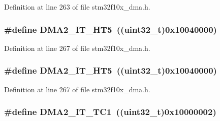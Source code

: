 Definition at line 263 of file stm32f10x\+\_\+dma.\+h.

\subsubsection[{\texorpdfstring{D\+M\+A2\+\_\+\+I\+T\+\_\+\+H\+T5}{DMA2_IT_HT5}}]{\setlength{\rightskip}{0pt plus 5cm}\#define D\+M\+A2\+\_\+\+I\+T\+\_\+\+H\+T5~(({\bf uint32\+\_\+t})0x10040000)}\hypertarget{group___d_m_a__interrupts__definition_ga4c1e0d1572267c1d48d787009148e3ef}{}\label{group___d_m_a__interrupts__definition_ga4c1e0d1572267c1d48d787009148e3ef}


Definition at line 267 of file stm32f10x\+\_\+dma.\+h.

\subsubsection[{\texorpdfstring{D\+M\+A2\+\_\+\+I\+T\+\_\+\+H\+T5}{DMA2_IT_HT5}}]{\setlength{\rightskip}{0pt plus 5cm}\#define D\+M\+A2\+\_\+\+I\+T\+\_\+\+H\+T5~(({\bf uint32\+\_\+t})0x10040000)}\hypertarget{group___d_m_a__interrupts__definition_ga4c1e0d1572267c1d48d787009148e3ef}{}\label{group___d_m_a__interrupts__definition_ga4c1e0d1572267c1d48d787009148e3ef}


Definition at line 267 of file stm32f10x\+\_\+dma.\+h.

\subsubsection[{\texorpdfstring{D\+M\+A2\+\_\+\+I\+T\+\_\+\+T\+C1}{DMA2_IT_TC1}}]{\setlength{\rightskip}{0pt plus 5cm}\#define D\+M\+A2\+\_\+\+I\+T\+\_\+\+T\+C1~(({\bf uint32\+\_\+t})0x10000002)}\hypertarget{group___d_m_a__interrupts__definition_ga2b6a86186eb56749032aa18b9baff850}{}\label{group___d_m_a__interrupts__definition_ga2b6a86186eb56749032aa18b9baff850}


